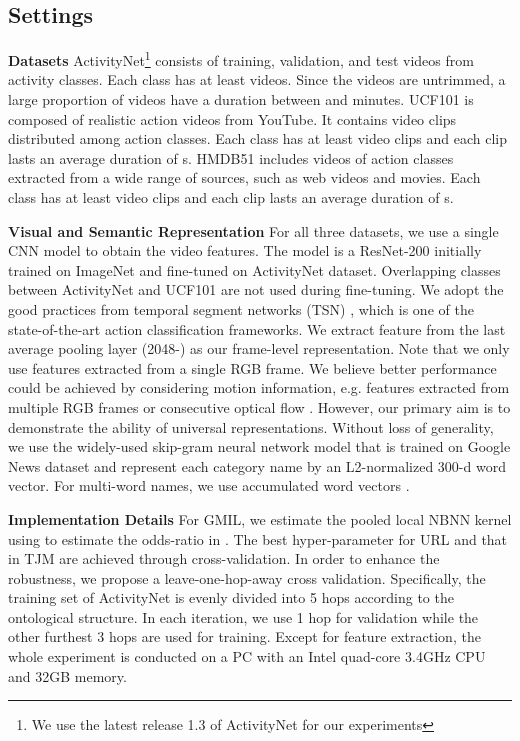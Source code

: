 \documentclass[10pt,twocolumn,letterpaper]{article}
\begin{document}
\subsection{Settings}
\noindent\textbf{Datasets} ActivityNet\footnote{We use the latest release 1.3 of ActivityNet for our experiments} consists of  training,  validation, and  test videos from  activity classes. Each class has at least  videos. Since the videos are untrimmed, a large proportion of videos have a duration between  and  minutes. UCF101 is composed of realistic action videos from YouTube. It contains  video clips distributed among  action classes. Each class has at least  video clips and each clip lasts an average duration of s. 
HMDB51 includes  videos of  action classes extracted from a wide range of sources, such as web videos and movies. 
Each class has at least  video clips and each clip lasts an average duration of s.

\noindent\textbf{Visual and Semantic Representation}  
For all three datasets, we use a single CNN model to obtain the video features. The model is a ResNet-200 initially trained on ImageNet and fine-tuned on ActivityNet dataset. Overlapping classes between ActivityNet and UCF101 are not used during fine-tuning. We adopt the good practices from temporal segment networks (TSN) \cite{TSN2016ECCV}, which is one of the state-of-the-art action classification frameworks. We extract feature from the last average pooling layer (2048-) as our frame-level representation. Note that we only use features extracted from a single RGB frame. We believe better performance could be achieved by considering motion information, e.g. features extracted from multiple RGB frames \cite{c3d2015} or consecutive optical flow \cite{twostream2014,densenet_flow_icip17,guided_flow_17}. However, our primary aim is to demonstrate the ability of universal representations. Without loss of generality, we use the widely-used skip-gram neural
network model \cite{W2V} that is trained on Google News dataset and represent each category name by
an L2-normalized 300-d word vector. For multi-word
names, we use accumulated word vectors \cite{W2V_accum}.

\noindent\textbf{Implementation Details} 
For GMIL, we estimate the pooled local NBNN kernel \cite{pooled_nbnn} using  to estimate the odds-ratio in \cite{local_nbnn}. The best hyper-parameter  for URL and that in TJM are achieved through cross-validation. In order to enhance the robustness, we propose a leave-one-hop-away cross validation. Specifically, the training set of ActivityNet is evenly divided into 5 hops according to the ontological structure. In each iteration, we use 1 hop for validation while the other furthest 3 hops are used for training. Except for feature extraction, the whole experiment is conducted on a PC with an
Intel quad-core 3.4GHz CPU and 32GB memory.
\end{document}
